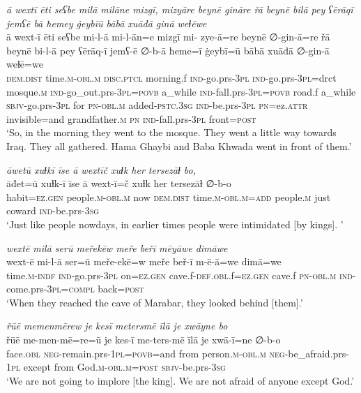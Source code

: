 \ea \label{BP.98}
\textit{ā wextī ēti seʕbe milā milāne mizgī, mizyāre beynē gināre řā beynē bilā pey ʕērāqī jemʕē bā ħemey ġeybīū bābā xuāđā ginā weɫēwe} \\ 
\gll ā wext-ī ēti seʕbe mi-l-ā mi-l-ān=e mizgī mi- zye-ā=re beynē ∅-gin-ā=re řā beynē bi-l-ā pey ʕērāq-ī jemʕ-ē ∅-b-ā ħeme=ī ġeybī=ū bābā xuāđā ∅-gin-ā weɫē=we \\ 
 \textsc{dem.dist} time\textsc{.m}\textsc{-obl}\textsc{.m} \textsc{disc.ptcl} morning.f \textsc{ind-}go.prs\textsc{-3pl} \textsc{ind-}go.prs\textsc{-3pl}=drct mosque\textsc{.m} \textsc{ind-}go\_out.prs\textsc{-3pl}\textsc{=\textsc{povb}} a\_while \textsc{ind-}fall.prs\textsc{-3pl}\textsc{=\textsc{povb}} road.f a\_while \textsc{sbjv-}go.prs\textsc{-3pl} for \textsc{pn}\textsc{-obl}\textsc{.m} added\textsc{-pstc}\textsc{.3sg} \textsc{ind-}be.prs\textsc{-3pl} \textsc{pn}=ez.\textsc{attr} invisible=and grandfather\textsc{.m} \textsc{pn} \textsc{ind-}fall.prs\textsc{-3pl} front\textsc{=\textsc{post}} \\ 
\glt `So, in the morning they went to the mosque. They went a little way towards Iraq. They all gathered. Hama Ghaybi and Baba Khwada went in front of them.'
\z 
 
\ea \label{BP.100}
\textit{āwetū xuɫkī īse ā wextīč xuɫk her tersezāɫ bo,} \\ 
\gll āđet=ū xuɫk-ī īse ā wext-ī=č xuɫk her tersezāɫ ∅-b-o \\ 
 habit\textsc{=ez.gen} people\textsc{.m}\textsc{-obl}\textsc{.m} now \textsc{dem.dist} time\textsc{.m}\textsc{-obl}\textsc{.m}\textsc{=add} people\textsc{.m} just coward \textsc{ind-}be.prs\textsc{-3sg} \\ 
\glt `Just like people nowdays, in earlier times people were intimidated [by kings]. '
\z 
 
\ea \label{BP.106}
\textit{wextē milā serū meřekēw meře beřī mēyāwe dimāwe} \\ 
\gll wext-ē mi-l-ā ser=ū meře-ekē=w meře beř-ī m-ē-ā=we dimā=we \\ 
 time\textsc{.m}\textsc{-indf} \textsc{ind-}go.prs\textsc{-3pl} on\textsc{=ez.gen} cave.f\textsc{-def}\textsc{.obl}.f\textsc{=ez.gen} cave.f \textsc{pn}\textsc{-obl}\textsc{.m} \textsc{ind-}come.prs\textsc{-3pl}\textsc{=compl} back\textsc{=\textsc{post}} \\ 
\glt `When they reached the cave of Marabar, they looked behind [them].'
\z 
 
\ea \label{BP.118}
\textit{řūē memenmērew je kesī metersmē īlā je xwāyne bo} \\ 
\gll řūē me-men-mē=re=ū je kes-ī me-ters-mē īlā je xwā-ī=ne ∅-b-o \\ 
 face\textsc{.obl} \textsc{neg-}remain.prs\textsc{-\textsc{1pl}}\textsc{=\textsc{povb}}=and from person\textsc{.m}\textsc{-obl}\textsc{.m} \textsc{neg-}be\_afraid.prs\textsc{-\textsc{1pl}} except from God\textsc{.m}\textsc{-obl}\textsc{.m}\textsc{=\textsc{post}} \textsc{sbjv-}be.prs\textsc{-3sg} \\ 
\glt `We are not going to implore [the king]. We are not afraid of anyone except God.'
\z 
 
